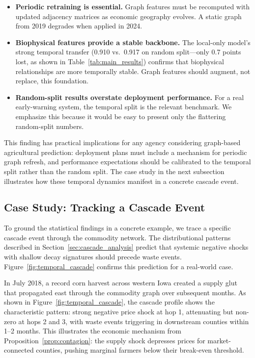 \documentclass[preprint,12pt,authoryear]{elsarticle}
\begin{document}
\begin{itemize}[leftmargin=*]
    \item \textbf{Periodic retraining is essential.} Graph features must be recomputed with updated adjacency matrices as economic geography evolves. A static graph from 2019 degrades when applied in 2024.
    \item \textbf{Biophysical features provide a stable backbone.} The local-only model's strong temporal transfer (0.910 vs.\ 0.917 on random split---only 0.7 points lost, as shown in Table~\ref{tab:main_results}) confirms that biophysical relationships are more temporally stable. Graph features should augment, not replace, this foundation.
    \item \textbf{Random-split results overstate deployment performance.} For a real early-warning system, the temporal split is the relevant benchmark. We emphasize this because it would be easy to present only the flattering random-split numbers.
\end{itemize}

This finding has practical implications for any agency considering graph-based agricultural prediction: deployment plans must include a mechanism for periodic graph refresh, and performance expectations should be calibrated to the temporal split rather than the random split. The case study in the next subsection illustrates how these temporal dynamics manifest in a concrete cascade event.

\subsection{Case Study: Tracking a Cascade Event}

To ground the statistical findings in a concrete example, we trace a specific cascade event through the commodity network. The distributional patterns described in Section~\ref{sec:cascade_analysis} predict that systemic negative shocks with shallow decay signatures should precede waste events. Figure~\ref{fig:temporal_cascade} confirms this prediction for a real-world case.

In July 2018, a record corn harvest across western Iowa created a supply glut that propagated east through the commodity graph over subsequent months. As shown in Figure~\ref{fig:temporal_cascade}, the cascade profile shows the characteristic pattern: strong negative price shock at hop 1, attenuating but non-zero at hops 2 and 3, with waste events triggering in downstream counties within 1--2 months. This illustrates the economic mechanism from Proposition~\ref{prop:contagion}: the supply shock depresses prices for market-connected counties, pushing marginal farmers below their break-even threshold.
\end{document}
